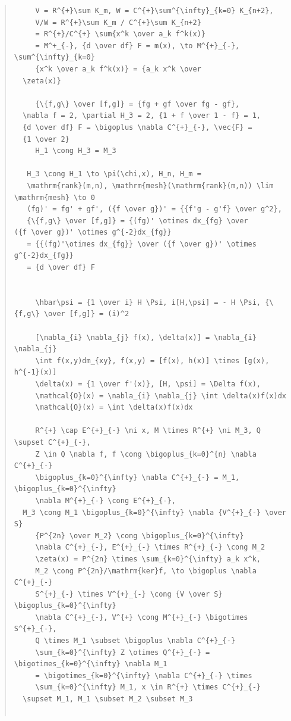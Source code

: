 \documentclass{jsarticle}
\begin{document}
{\begin{quote}
\begin{verbatim}
     V = R^{+}\sum K_m, W = C^{+}\sum^{\infty}_{k=0} K_{n+2}, 
     V/W = R^{+}\sum K_m / C^{+}\sum K_{n+2}   
     = R^{+}/C^{+} \sum{x^k \over a_k f^k(x)}   
     = M^+_{-}, {d \over df} F = m(x), \to M^{+}_{-}, \sum^{\infty}_{k=0}
     {x^k \over a_k f^k(x)} = {a_k x^k \over 
  \zeta(x)}   

     {\{f,g\} \over [f,g]} = {fg + gf \over fg - gf}, 
  \nabla f = 2, \partial H_3 = 2, {1 + f \over 1 - f} = 1,
  {d \over df} F = \bigoplus \nabla C^{+}_{-}, \vec{F} =
  {1 \over 2}   
     H_1 \cong H_3 = M_3   

   H_3 \cong H_1 \to \pi(\chi,x), H_n, H_m = 
   \mathrm{rank}(m,n), \mathrm{mesh}(\mathrm{rank}(m,n)) \lim \mathrm{mesh} \to 0   
   (fg)' = fg' + gf', ({f \over g})' = {{f'g - g'f} \over g^2}, 
   {\{f,g\} \over [f,g]} = {(fg)' \otimes dx_{fg} \over 
({f \over g})' \otimes g^{-2}dx_{fg}}   
   = {{(fg)'\otimes dx_{fg}} \over ({f \over g})' \otimes g^{-2}dx_{fg}}   
   = {d \over df} F   


     \hbar\psi = {1 \over i} H \Psi, i[H,\psi] = - H \Psi, {\{f,g\} \over [f,g]} = (i)^2   

     [\nabla_{i} \nabla_{j} f(x), \delta(x)] = \nabla_{i} \nabla_{j} 
     \int f(x,y)dm_{xy}, f(x,y) = [f(x), h(x)] \times [g(x), h^{-1}(x)]   
     \delta(x) = {1 \over f'(x)}, [H, \psi] = \Delta f(x), 
     \mathcal{O}(x) = \nabla_{i} \nabla_{j} \int \delta(x)f(x)dx   
     \mathcal{O}(x) = \int \delta(x)f(x)dx   

     R^{+} \cap E^{+}_{-} \ni x, M \times R^{+} \ni M_3, Q \supset C^{+}_{-}, 
     Z \in Q \nabla f, f \cong \bigoplus_{k=0}^{n} \nabla C^{+}_{-}   
     \bigoplus_{k=0}^{\infty} \nabla C^{+}_{-} = M_1, \bigoplus_{k=0}^{\infty}
     \nabla M^{+}_{-} \cong E^{+}_{-},
  M_3 \cong M_1 \bigoplus_{k=0}^{\infty} \nabla {V^{+}_{-} \over S}   
     {P^{2n} \over M_2} \cong \bigoplus_{k=0}^{\infty} 
     \nabla C^{+}_{-}, E^{+}_{-} \times R^{+}_{-} \cong M_2   
     \zeta(x) = P^{2n} \times \sum_{k=0}^{\infty} a_k x^k, 
     M_2 \cong P^{2n}/\mathrm{ker}f, \to \bigoplus \nabla C^{+}_{-}   
     S^{+}_{-} \times V^{+}_{-} \cong {V \over S} \bigoplus_{k=0}^{\infty}
     \nabla C^{+}_{-}, V^{+} \cong M^{+}_{-} \bigotimes S^{+}_{-}, 
     Q \times M_1 \subset \bigoplus \nabla C^{+}_{-}    
     \sum_{k=0}^{\infty} Z \otimes Q^{+}_{-} = \bigotimes_{k=0}^{\infty} \nabla M_1   
     = \bigotimes_{k=0}^{\infty} \nabla C^{+}_{-} \times 
     \sum_{k=0}^{\infty} M_1, x \in R^{+} \times C^{+}_{-}
  \supset M_1, M_1 \subset M_2 \subset M_3   


\end{verbatim}
\end{quote}}
\end{document}
